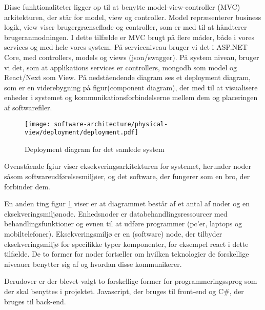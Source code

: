 Disse funktionaliteter ligger op til at benytte model-view-controller (MVC) arkitekturen, der står for model, view og controller. Model repræsenterer business logik, view viser brugergrænseflade og controller, som er med til at håndterer brugeranmodningen. I dette tilfælde er MVC brugt på flere måder, både i vores services og med hele vores system. På serviceniveau bruger vi det i ASP.NET Core, med controllers, models og views (json/swagger). På system niveau, bruger vi det, som at applikations services er controllers, mongodb som model og React/Next som View. På nedståendende diagram ses et deployment diagram, som er en viderebygning på figur(component diagram), der med til at visualisere enheder i systemet og kommunikationsforbindelserne mellem dem og placeringen af softwarefiler.


\begin{figure}[H]
    \centering
\texttt{[image: software-architecture/physical-view/deployment/deployment.pdf]}
\caption{Deployment diagram for det samlede system}
\label{fig:deploymentdiagram}
\end{figure}

Ovenstående fgiur viser eksekveringsarkitekturen for systemet, herunder noder såsom softwareudførelsesmiljøer, og det software, der fungerer som en bro, der forbinder dem. 

En anden ting figur \ref{fig:deploymentdiagram} viser er at diagrammet består af et antal af noder og en eksekveringsmiljønode. Enhedsnoder er databehandlingsressourcer med behandlingsfunktioner og evnen til at udføre programmer (pc'er, laptops og mobiltelefoner).  Eksekveringsmiljø er en (software) node, der tilbyder eksekveringsmiljø for specifikke typer komponenter, for eksempel react i dette tilfælde. De to former for noder fortæller om hvilken teknologier de forskellige niveauer benytter sig af og hvordan disse kommunikerer.

Derudover er der blevet valgt to forskellige former for programmeringssprog som der skal benyttes i projektet. Javascript, der bruges til front-end og C\#, der bruges til back-end. 



